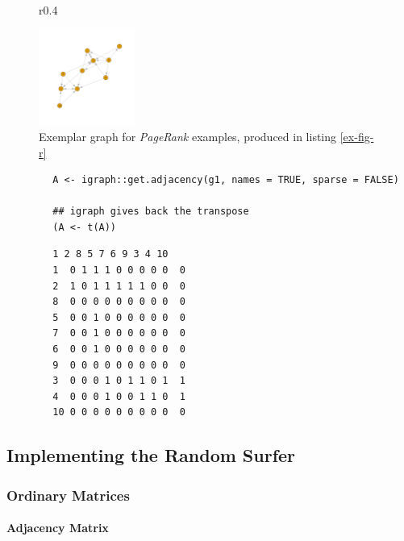 \documentclass[11pt]{article}
\begin{document}
\begin{figure}{r}{0.4\textwidth}
\begin{center}
\includegraphics[width=0.28\textwidth]{media/example-graph-power-walk.png}
\end{center}
\caption{\label{example-rs-graph}Exemplar graph for \emph{PageRank} examples, produced in listing \ref{ex-fig-r}}
\end{figure}


\begin{listing}[htbp]
    \begin{tcolorbox}
        \begin{verbatim}
        A <- igraph::get.adjacency(g1, names = TRUE, sparse = FALSE)

        ## igraph gives back the transpose
        (A <- t(A))
        \end{verbatim}
        \caption{\label{adj-mat-random-surf}Return the Adjacency Matrix corresponding to figure \ref{example-rs-graph}}
    \tcblower
        \begin{verbatim}
        1 2 8 5 7 6 9 3 4 10
        1  0 1 1 1 0 0 0 0 0  0
        2  1 0 1 1 1 1 1 0 0  0
        8  0 0 0 0 0 0 0 0 0  0
        5  0 0 1 0 0 0 0 0 0  0
        7  0 0 1 0 0 0 0 0 0  0
        6  0 0 1 0 0 0 0 0 0  0
        9  0 0 0 0 0 0 0 0 0  0
        3  0 0 0 1 0 1 1 0 1  1
        4  0 0 0 1 0 0 1 1 0  1
        10 0 0 0 0 0 0 0 0 0  0
        \end{verbatim}
    \end{tcolorbox}
\end{listing}



\subsection{Implementing the Random Surfer}
\label{sec:orgb756c9c}
\subsubsection{Ordinary Matrices}
\label{implementing-page-rank-methods}
\paragraph{Adjacency Matrix}
\label{adjacency-matrix}
\end{document}
